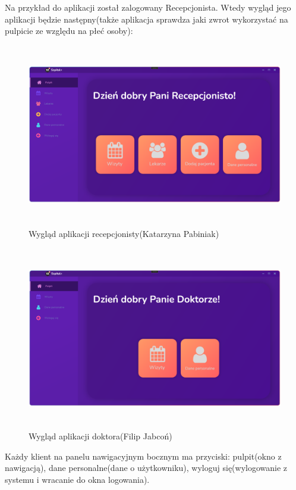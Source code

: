Na przykład do aplikacji został zalogowany Recepcjonista.
Wtedy wygląd jego aplikacji będzie następny(także aplikacja sprawdza jaki zwrot wykorzystać na pulpicie ze względu na płeć osoby):

\begin{figure}[H]
\begin{center}
    \includegraphics[height=8cm]{images/recep_view.png}
    \caption{Wygląd aplikacji recepcjonisty(Katarzyna Pabiniak)}
\end{center}
\end{figure}

\begin{figure}[H]
\begin{center}
    \includegraphics[height=8cm]{images/doktor_view.png}
    \caption{Wygląd aplikacji doktora(Filip Jabcoń)}
\end{center}
\end{figure}

Każdy klient na panelu nawigacyjnym bocznym ma przyciski: pulpit(okno z nawigacją), dane personalne(dane o użytkowniku), wyloguj się(wylogowanie z systemu i wracanie do okna logowania).

